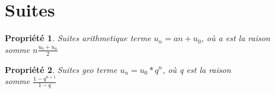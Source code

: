 \newtheorem{property}{Propri\'et\'e}

\section{Suites}
	\begin{property}{Suites arithmetique}
		terme $u_n = an+u_0$, o\`u a est la raison \\
		somme $n\frac{u_0+u_n}{2}$
	\end{property}
	\begin{property}{Suites geo}
		terme  $u_n=u_0*q^n$, o\`u q est la raison \\
		somme  $\frac{1-q^{n+1}}{1-q}$ 
	\end{property}


